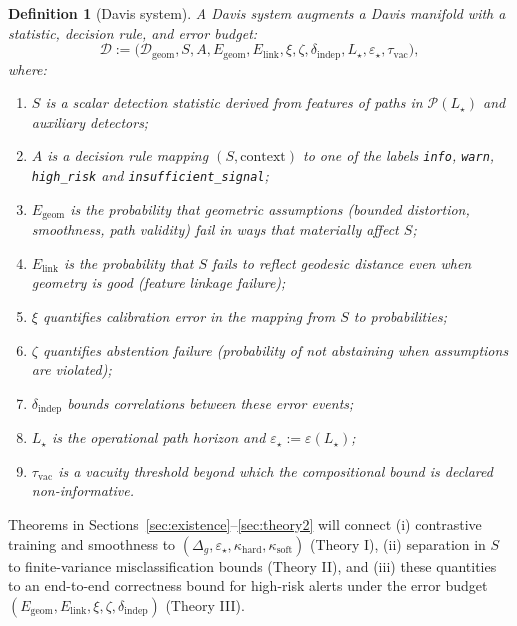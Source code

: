 \documentclass[11pt]{article}
\newtheorem{definition}{Definition}
\theoremstyle{remark}
\theoremstyle{plain}
\begin{document}
\begin{definition}[Davis system]\label{def:davis-system}
A \emph{Davis system} augments a Davis manifold with a statistic, decision rule, and
error budget:
\[
    \mathcal{D}
    :=
    \bigl(\mathcal{D}_{\text{geom}}, S, A,
    E_{\text{geom}}, E_{\text{link}}, \xi, \zeta, \delta_{\text{indep}},
    L_\star, \varepsilon_\star, \tau_{\text{vac}}\bigr),
\]
where:
\begin{enumerate}[label=(\roman*),leftmargin=*]
    \item $S$ is a scalar detection statistic derived from features of paths in $\mathcal{P}(L_\star)$
    and auxiliary detectors;
    \item $A$ is a decision rule mapping $(S,\text{context})$ to one of the labels \texttt{info},
    \texttt{warn}, \texttt{high\_risk} and \texttt{insufficient\_signal};
    \item $E_{\text{geom}}$ is the probability that geometric assumptions (bounded distortion,
    smoothness, path validity) fail in ways that materially affect $S$;
    \item $E_{\text{link}}$ is the probability that $S$ fails to reflect geodesic distance even when
    geometry is good (feature linkage failure);
    \item $\xi$ quantifies calibration error in the mapping from $S$ to probabilities;
    \item $\zeta$ quantifies abstention failure (probability of not abstaining when assumptions
    are violated);
    \item $\delta_{\text{indep}}$ bounds correlations between these error events;
    \item $L_\star$ is the operational path horizon and $\varepsilon_\star := \varepsilon(L_\star)$;
    \item $\tau_{\text{vac}}$ is a vacuity threshold beyond which the compositional bound is
    declared non-informative.
\end{enumerate}
\end{definition}

Theorems in Sections~\ref{sec:existence}--\ref{sec:theory2} will connect (i) contrastive training
and smoothness to $(\Delta_g,\varepsilon_\star,\kappa_{\mathrm{hard}},\kappa_{\mathrm{soft}})$ (Theory I),
(ii) separation in $S$ to finite-variance misclassification bounds (Theory II), and (iii) these
quantities to an end-to-end correctness bound for high-risk alerts under the error budget
$(E_{\text{geom}},E_{\text{link}},\xi,\zeta,\delta_{\text{indep}})$ (Theory III).
\end{document}

